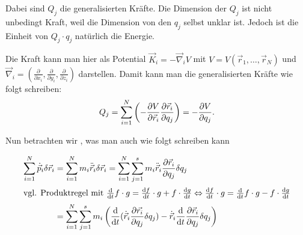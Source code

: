 Dabei sind $Q_j$ die generalisierten Kräfte. Die Dimension der $Q_j$ ist nicht unbedingt Kraft, weil die Dimension von den $q_j$ selbst unklar ist. Jedoch ist die Einheit von $Q_j \cdot q_j$ natürlich die Energie.

\begin{bemerkung*}
	Die Kraft kann man hier als Potential $\vec{K}_i = - \vec\nabla_i V$ 
	mit $V = V(\vec{r}_1, \dots, \vec{r}_N)$ 
	und $\vec{\nabla}_i = \left( \frac{\partial}{\partial x_i}, \frac{\partial}{\partial y_i}, \frac{\partial}{\partial z_i} \right)$ 
	darstellen. Damit kann man die generalisierten Kräfte wie folgt schreiben:
	\[
		Q_j = \sum_{i = 1}^N \left( - \frac{\partial V}{\partial \vec{r}_i} \frac{\partial \vec{r}_i}{\partial q_j} \right) = - \frac{\partial V}{\partial q_j}
		\text{.}
	\]
\end{bemerkung*}

Nun betrachten wir , was man auch wie folgt schreiben kann

\begin{align*}
\sum_{i = 1}^{N} \dot{\vec{p}}_i \delta \vec{r}_i 
&= \sum_{i = 1}^N m_i \ddot{\vec{r}}_i \delta \vec{r}_i 
= \sum_{i = 1}^N \sum_{j = 1}^s m_i \ddot{\vec{r}}_i  \frac{\partial \vec{r}_i}{\partial q_j} \delta q_j \\
\intertext{vgl. Produktregel mit $\frac{\mathrm d}{\mathrm d t} f \cdot g = \frac{\mathrm d f}{\mathrm d t} \cdot g + f \cdot \frac{\mathrm d g}{\mathrm d t} \Leftrightarrow \frac{\mathrm d f}{\mathrm d t} \cdot g = \frac{\mathrm d}{\mathrm d t} f \cdot g - f \cdot \frac{\mathrm d g}{\mathrm d t}$}
&= \sum_{i=1}^N \sum_{j=1}^s m_i \left(\frac{\mathrm d}{\mathrm d t} (\dot{\vec{r}}_i \frac{\partial \vec{r_i}}{\partial q_j} \delta q_j) -\dot{\vec{r}}_i \frac{\mathrm d}{\mathrm d t} \frac{\partial \vec{r}_i}{\partial q_j} \delta q_j \right)
\end{align*}

